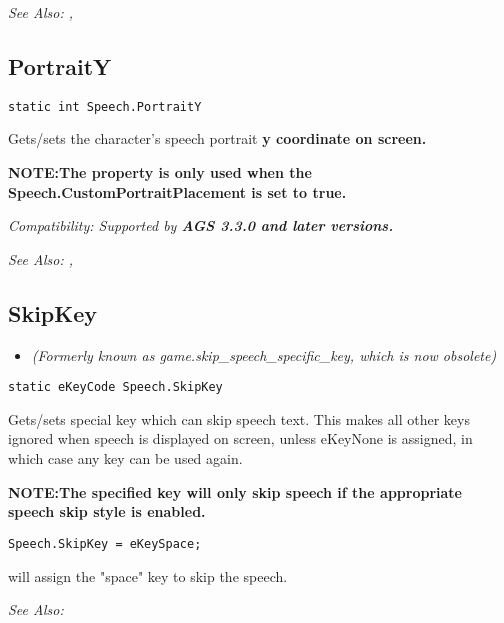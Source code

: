 \it{See Also:} ,


\subsection{PortraitY}\label{Speech.PortraitY}%

\begin{verbatim}
static int Speech.PortraitY
\end{verbatim}

Gets/sets the character's speech portrait \bf{y} coordinate on screen.

\bf{NOTE:}The property is only used when the \bf{Speech.CustomPortraitPlacement} is set to \bf{true}.

\it{Compatibility:} Supported by \bf{AGS 3.3.0} and later versions.

\it{See Also:} ,


\subsection{SkipKey}\label{Speech.SkipKey}%

\begin{itemize}
\item \it{(Formerly known as game.skip_speech_specific_key, which is now obsolete)}
\end{itemize}

\begin{verbatim}
static eKeyCode Speech.SkipKey
\end{verbatim}

Gets/sets special key which can skip speech text. This makes all other keys ignored
when speech is displayed on screen, unless eKeyNone is assigned, in which case
any key can be used again.

\bf{NOTE:}The specified key will only skip speech if the appropriate speech skip style is enabled.

\begin{verbatim}
Speech.SkipKey = eKeySpace;
\end{verbatim}
will assign the "space" key to skip the speech.

\it{See Also:} 


